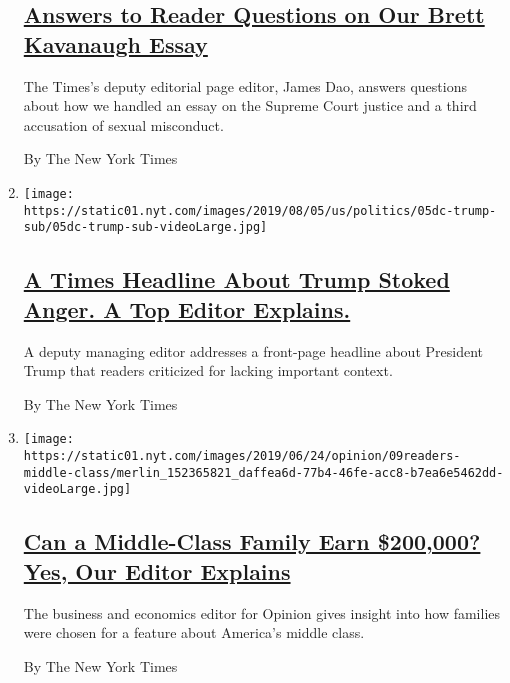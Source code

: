 \begin{enumerate}
  \hypertarget{answers-to-reader-questions-on-our-brett-kavanaugh-essay}{%
  \subsection{\texorpdfstring{\href{/2019/09/16/reader-center/brett-kavanaugh-accusation-yale.html}{Answers
  to Reader Questions on Our Brett Kavanaugh
  Essay}}{Answers to Reader Questions on Our Brett Kavanaugh Essay}}\label{answers-to-reader-questions-on-our-brett-kavanaugh-essay}}

  The Times's deputy editorial page editor, James Dao, answers questions
  about how we handled an essay on the Supreme Court justice and a third
  accusation of sexual misconduct.

  By The New York Times
\item
  \texttt{[image: https://static01.nyt.com/images/2019/08/05/us/politics/05dc-trump-sub/05dc-trump-sub-videoLarge.jpg]}

  \hypertarget{a-times-headline-about-trump-stoked-anger-a-top-editor-explains}{%
  \subsection{\texorpdfstring{\href{/2019/08/06/reader-center/trump-mass-shootings-headline.html}{A
  Times Headline About Trump Stoked Anger. A Top Editor
  Explains.}}{A Times Headline About Trump Stoked Anger. A Top Editor Explains.}}\label{a-times-headline-about-trump-stoked-anger-a-top-editor-explains}}

  A deputy managing editor addresses a front-page headline about
  President Trump that readers criticized for lacking important context.

  By The New York Times
\item
  \texttt{[image: https://static01.nyt.com/images/2019/06/24/opinion/09readers-middle-class/merlin\_152365821\_daffea6d-77b4-46fe-acc8-b7ea6e5462dd-videoLarge.jpg]}

  \hypertarget{can-a-middle-class-family-earn-200000-yes-our-editor-explains}{%
  \subsection{\texorpdfstring{\href{/2019/07/09/reader-center/middle-class-families.html}{Can
  a Middle-Class Family Earn \$200,000? Yes, Our Editor
  Explains}}{Can a Middle-Class Family Earn \$200,000? Yes, Our Editor Explains}}\label{can-a-middle-class-family-earn-200000-yes-our-editor-explains}}

  The business and economics editor for Opinion gives insight into how
  families were chosen for a feature about America's middle class.

  By The New York Times
\end{enumerate}


